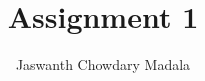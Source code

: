 \documentclass[journal,12pt,twocolumn]{IEEEtran}
\begin{document}
\vspace{3cm}


\title{Assignment 1}
\author{Jaswanth Chowdary Madala}





\maketitle

\newpage


\bigskip

\renewcommand{\thefigure}{\theenumi}
\renewcommand{\thetable}{\theenumi}


\begin{enumerate}


\end{enumerate}
\end{document}
